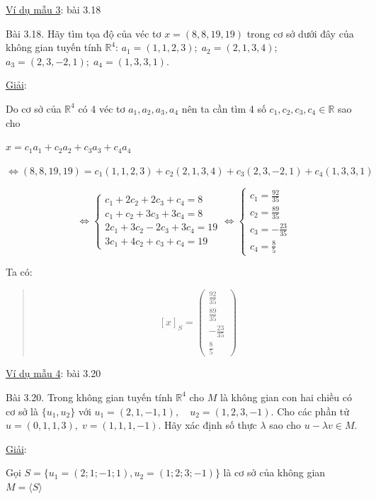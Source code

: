\documentclass[12pt,a4paper]{article}
\newcommand{\ul}[1]{\uline{#1}}
\begin{document}
\ul{Ví dụ mẫu 3}: bài 3.18

Bài 3.18. Hãy tìm tọa độ của véc tơ $x = (8, 8, 19, 19)$
trong cơ sở dưới đây của không gian tuyến tính $\mathbb{R}^4$:
$a_1 = (1, 1, 2, 3);\; a_2 = (2, 1, 3, 4);$
$a_3 = (2, 3, -2, 1);\; a_4 = (1, 3, 3, 1).$

\ul{Giải}:

Do cơ sở của $\mathbb{R}^4$ có 4 véc
tơ $a_1, a_2, a_3, a_4$ nên ta cần tìm 4
số $c_1, c_2, c_3, c_4 \in \mathbb{R}$ sao cho

$x = c_1a_1 + c_2a_2 + c_3a_3 + c_4a_4$

$\Leftrightarrow (8, 8, 19, 19) = c_1(1, 1, 2, 3) + c_2(2, 1, 3, 4) + c_3(2, 3, -2, 1) + c_4(1, 3, 3, 1)$

\[\Leftrightarrow \begin{cases} c_1 + 2c_2 + 2c_3 + c_4 = 8 \\ c_1 + c_2 + 3c_3 + 3c_4 = 8 \\ 2c_1 + 3c_2 - 2c_3 + 3c_4 = 19 \\ 3c_1 + 4c_2 + c_3 + c_4 = 19 \end{cases} \Leftrightarrow \begin{cases} c_1 = \frac{92}{35} \\ c_2 = \frac{89}{35} \\ c_3 = -\frac{23}{35} \\ c_4 = \frac{8}{5} \end{cases}\]

Ta có:

\begin{quote}
\[[x]_S = \begin{pmatrix} \frac{92}{35} \\ \frac{89}{35} \\ -\frac{23}{35} \\ \frac{8}{5} \end{pmatrix}\]
\end{quote}

\ul{Ví dụ mẫu 4}: bài 3.20

Bài 3.20. Trong không gian tuyến tính $\mathbb{R}^4$ cho $M$ là
không gian con hai chiều có cơ sở là $\{u_1, u_2\}$ với
$u_1 = (2, 1, -1, 1),\quad u_2 = (1, 2, 3, -1).$
Cho các phần tử $u = (0, 1, 1, 3),\; v = (1, 1, 1, -1)$. Hãy
xác định số thực $\lambda$ sao cho $u - \lambda v \in M.$

\ul{Giải}:

Gọi $S = \{u_1 = (2; 1; -1; 1), u_2 = (1; 2; 3; -1)\}$ là cơ sở của
không gian $M = \langle S \rangle$
\end{document}

